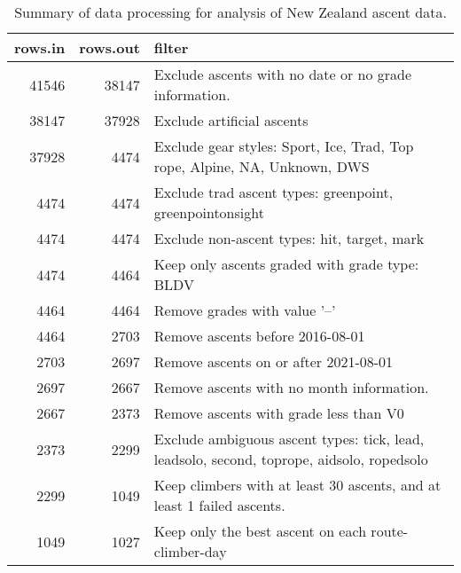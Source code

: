 \begin{table}[ht]
\centering
\begingroup\fontsize{9pt}{10pt}\selectfont
\begin{tabular}{rrl}
  \hline
{\bf rows.in} & {\bf rows.out} & {\bf filter} \\ 
  \hline
41546 & 38147 & Exclude ascents with no date or no grade information. \\ 
  38147 & 37928 & Exclude artificial ascents \\ 
  37928 & 4474 & Exclude gear styles: Sport, Ice, Trad, Top rope, Alpine, NA, Unknown, DWS \\ 
  4474 & 4474 & Exclude trad ascent types: greenpoint, greenpointonsight \\ 
  4474 & 4474 & Exclude non-ascent types: hit, target, mark \\ 
  4474 & 4464 & Keep only ascents graded with grade type: BLDV \\ 
  4464 & 4464 & Remove grades with value '--' \\ 
  4464 & 2703 & Remove ascents before 2016-08-01 \\ 
  2703 & 2697 & Remove ascents on or after 2021-08-01 \\ 
  2697 & 2667 & Remove ascents with no month information. \\ 
  2667 & 2373 & Remove ascents with grade less than V0 \\ 
  2373 & 2299 & Exclude ambiguous ascent types: tick, lead, leadsolo, second, toprope, aidsolo, ropedsolo \\ 
  2299 & 1049 & Keep climbers with at least 30 ascents, and at least 1 failed ascents. \\ 
  1049 & 1027 & Keep only the best ascent on each route-climber-day \\ 
   \hline
\end{tabular}
\endgroup
\caption{Summary of data processing for analysis of New Zealand ascent data.} 
\label{table-data-processing-nz}
\end{table}
